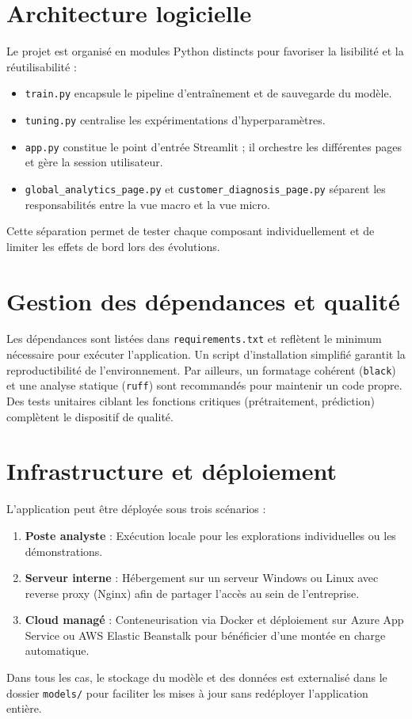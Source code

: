 \section{Architecture logicielle}
Le projet est organisé en modules Python distincts pour favoriser la lisibilité et la réutilisabilité :
\begin{itemize}
    \item \texttt{train.py} encapsule le pipeline d'entraînement et de sauvegarde du modèle.
    \item \texttt{tuning.py} centralise les expérimentations d'hyperparamètres.
    \item \texttt{app.py} constitue le point d'entrée Streamlit ; il orchestre les différentes pages et gère la session utilisateur.
    \item \texttt{global\_analytics\_page.py} et \texttt{customer\_diagnosis\_page.py} séparent les responsabilités entre la vue macro et la vue micro.
\end{itemize}
Cette séparation permet de tester chaque composant individuellement et de limiter les effets de bord lors des évolutions.

\section{Gestion des dépendances et qualité}
Les dépendances sont listées dans \texttt{requirements.txt} et reflètent le minimum nécessaire pour exécuter l'application. Un script d'installation simplifié garantit la reproductibilité de l'environnement. Par ailleurs, un formatage cohérent (\texttt{black}) et une analyse statique (\texttt{ruff}) sont recommandés pour maintenir un code propre. Des tests unitaires ciblant les fonctions critiques (prétraitement, prédiction) complètent le dispositif de qualité.

\section{Infrastructure et déploiement}
L'application peut être déployée sous trois scénarios :
\begin{enumerate}
    \item \textbf{Poste analyste} : Exécution locale pour les explorations individuelles ou les démonstrations.
    \item \textbf{Serveur interne} : Hébergement sur un serveur Windows ou Linux avec reverse proxy (Nginx) afin de partager l'accès au sein de l'entreprise.
    \item \textbf{Cloud managé} : Conteneurisation via Docker et déploiement sur Azure App Service ou AWS Elastic Beanstalk pour bénéficier d'une montée en charge automatique.
\end{enumerate}
Dans tous les cas, le stockage du modèle et des données est externalisé dans le dossier \texttt{models/} pour faciliter les mises à jour sans redéployer l'application entière.
